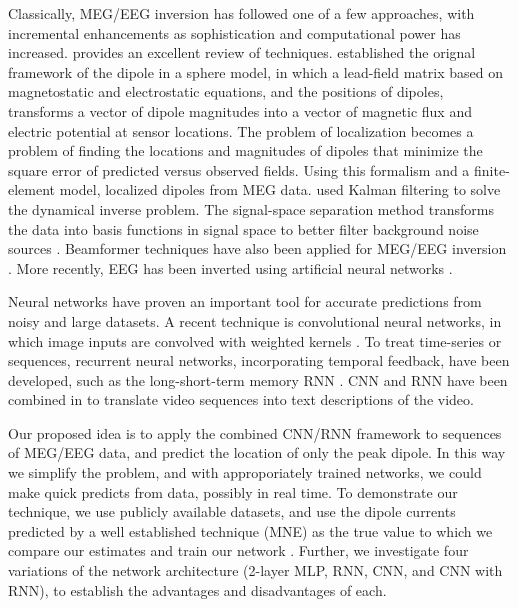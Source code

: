 \documentclass[journal,12pt,onecolumn,draftclsnofoot]{IEEEtran}
\begin{document}
Classically, MEG/EEG inversion has followed one of a few approaches, with incremental enhancements as sophistication and computational power has increased. \cite{grech2008review} provides an excellent review of techniques. \cite{mosher1992multiple} established the orignal framework of the dipole in a sphere model, in which a lead-field matrix based on magnetostatic and electrostatic equations, and the positions of dipoles, transforms a vector of dipole magnitudes into a vector of magnetic flux and electric potential at sensor locations. The problem of localization becomes a problem of finding the locations and magnitudes of dipoles that minimize the square error of predicted versus observed fields. Using this formalism and a finite-element model, \cite{buchner1997inverse} localized dipoles from MEG data. \cite{galka2004solution} used Kalman filtering to solve the dynamical inverse problem. The signal-space separation method transforms the data into basis functions in signal space to better filter background noise sources \cite{taulu2005applications}. Beamformer techniques have also been applied for MEG/EEG inversion \cite{sekihara2001reconstructing}. More recently, EEG has been inverted using artificial neural networks \cite{van2000eeg}.


Neural networks have proven an important tool for accurate predictions from noisy and large datasets. A recent technique is convolutional neural networks, in which image inputs are convolved with weighted kernels \cite{lecun1998gradient}. To treat time-series or sequences, recurrent neural networks, incorporating temporal feedback, have been developed, such as the long-short-term memory RNN \cite{hochreiter1997long}. CNN and RNN have been combined in \cite{venugopalan2014translating} to translate video sequences into text descriptions of the video.


Our proposed idea is to apply the combined CNN/RNN framework to sequences of MEG/EEG data, and predict the location of only the peak dipole. In this way we simplify the problem, and with approporiately trained networks, we could make quick predicts from data, possibly in real time. To demonstrate our technique, we use publicly available datasets, and use the dipole currents predicted by a well established technique (MNE) as the true value to which we compare our estimates and train our network \cite{gramfort2014mne}. Further, we investigate four variations of the network architecture (2-layer MLP, RNN, CNN, and CNN with RNN), to establish the advantages and disadvantages of each.
\end{document}
